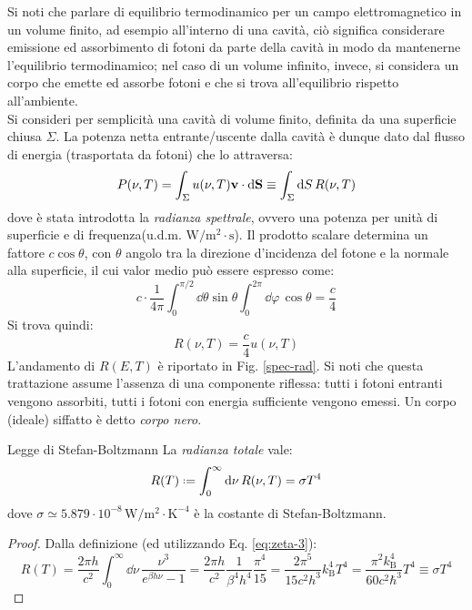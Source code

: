 Si noti che parlare di equilibrio termodinamico per un campo elettromagnetico in un volume finito, ad esempio all'interno di una cavità, ciò significa considerare emissione ed assorbimento di fotoni da parte della cavità in modo da mantenerne l'equilibrio termodinamico; nel caso di un volume infinito, invece, si considera un corpo che emette ed assorbe fotoni e che si trova all'equilibrio rispetto all'ambiente. \\
Si consideri per semplicità una cavità di volume finito, definita da una superficie chiusa $ \Sigma $. La potenza netta entrante/uscente dalla cavità è dunque dato dal flusso di energia (trasportata da fotoni) che lo attraversa:
\begin{equation*}
	P(\nu,T) = \int_\Sigma u(\nu,T) \mathbf{v} \cdot \mathrm{d} \mathbf{S} \equiv \int_\Sigma \mathrm{d} S\, R(\nu,T)
\end{equation*}
dove è stata introdotta la \textit{radianza spettrale}, ovvero una potenza per unità di superficie e di frequenza(u.d.m. $ \text{W}/\text{m}^2 \cdot \text{s} $). Il prodotto scalare determina un fattore $ c \cos \theta $, con $ \theta $ angolo tra la direzione d'incidenza del fotone e la normale alla superficie, il cui valor medio può essere espresso come:
\begin{equation*}
	c \cdot \frac{1}{4\pi} \int_0^{\pi/2} \dd \theta \sin \theta \int_0^{2\pi} \dd \varphi\, \cos \theta = \frac{c}{4}
\end{equation*}
Si trova quindi:
\begin{equation}
	R(\nu,T) = \frac{c}{4} u(\nu,T)
\end{equation}
L'andamento di $ R(E,T) $ è riportato in Fig. \ref{spec-rad}.
Si noti che questa trattazione assume l'assenza di una componente riflessa: tutti i fotoni entranti vengono assorbiti, tutti i fotoni con energia sufficiente vengono emessi. Un corpo (ideale) siffatto è detto \textit{corpo nero}.

\begin{theorem}{Legge di Stefan-Boltzmann}{}
	La \textit{radianza totale} vale:
	\begin{equation}
		R(T) \defeq \int_0^\infty \dd \nu\, R(\nu,T) = \sigma T^4
	\end{equation}
	dove $ \sigma \simeq 5.879 \cdot 10^{-8} \,\text{W}/\text{m}^2 \cdot \text{K}^{-4} $ è la costante di Stefan-Boltzmann.

	\tcblower

	\begin{proof}
		Dalla definizione (ed utilizzando Eq. \ref{eq:zeta-3}):
		\begin{equation*}
			R(T) = \frac{2\pi h}{c^2} \int_0^\infty \dd \nu\, \frac{\nu^3}{e^{\beta h \nu} - 1} = \frac{2\pi h}{c^2} \frac{1}{\beta^4 h^4} \frac{\pi^4}{15} = \frac{2\pi^5}{15 c^2 h^3} k_\text{B}^4 T^4 = \frac{\pi^2 k_\text{B}^4}{60 c^2 \hbar^3} T^4 \equiv \sigma T^4
		\end{equation*}
	\end{proof}
\end{theorem}

